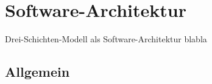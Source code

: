 \chapter{Software-Architektur}
Drei-Schichten-Modell als Software-Architektur blabla
\section{Allgemein}